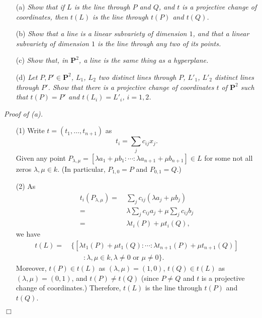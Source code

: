 \documentclass{article}
\begin{document}
\begin{enumerate}
\item[(a)]
  \emph{Show that if $L$ is the line through $P$ and $Q$,
  and $t$ is a projective change of coordinates,
  then $t(L)$ is the line through $t(P)$ and $t(Q)$.}

\item[(b)]
  \emph{Show that a line is a linear subvariety of dimension $1$,
  and that a linear subvariety of dimension $1$ is the line through any two of its points.}

\item[(c)]
  \emph{Show that, in $\mathbf{P}^{2}$, a line is the same thing as a hyperplane.}

\item[(d)]
  \emph{Let $P, P' \in \mathbf{P}^{2}$, $L_1$, $L_2$ two distinct lines through $P$,
  $L'_1$, $L'_2$ distinct lines through $P'$.
  Show that there is a projective change of coordinates $t$ of $\mathbf{P}^{2}$
  such that $t(P) = P'$ and $t(L_i) = L'_i$, $i = 1, 2$.} \\
\end{enumerate}



\emph{Proof of (a).}
\begin{enumerate}
\item[(1)]
  Write $t = (t_1, \ldots, t_{n+1})$ as
  \[
    t_i = \sum_{j} c_{ij} x_j.
  \]
  Given any point
  $P_{\lambda,\mu}
  = [ \lambda a_1 + \mu b_1 : \cdots : \lambda a_{n+1} + \mu b_{n+1} ] \in L$
  for some not all zeros $\lambda, \mu \in k$.
  (In particular, $P_{1,0} = P$ and $P_{0,1} = Q$.)

\item[(2)]
  As
  \begin{align*}
    t_i(P_{\lambda,\mu})
    =& \: \sum_{j} c_{ij}(\lambda a_j + \mu b_j) \\
    =& \: \lambda \sum_{j} c_{ij}a_j + \mu \sum_{j} c_{ij}b_j \\
    =& \: \lambda t_i(P) + \mu t_i(Q),
  \end{align*}
  we have
  \begin{align*}
    t(L) = &\: \{ [ \lambda t_1(P) + \mu t_1(Q) : \cdots :
        \lambda t_{n+1}(P) + \mu t_{n+1}(Q) ] \\
      & \qquad : \lambda, \mu \in k, \lambda \neq 0 \text{ or } \mu \neq 0 \}.
  \end{align*}
  Moreover, $t(P) \in t(L)$ as $(\lambda,\mu) = (1,0)$,
  $t(Q) \in t(L)$ as $(\lambda,\mu) = (0,1)$,
  and $t(P) \neq t(Q)$ (since $P \neq Q$ and $t$ is a projective change of coordinates.)
  Therefore, $t(L)$ is the line through $t(P)$ and $t(Q)$.
\end{enumerate}
$\Box$ \\
\end{document}
